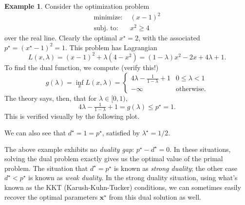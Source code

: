 \documentclass[10pt,letterpaper]{article}
\theoremstyle{definition}
\newtheorem{example}[theorem]{Example}
\theoremstyle{remark}
\newcommand\x{\boldsymbol{x}}
\begin{document}
\begin{example}
    Consider the optimization problem
    \begin{align*}
        \text{minimize: } & (x-1)^2\\
        \text{subj. to: } & x^2 \geq 4
    \end{align*}
    over the real line. Clearly the optimal $x^\star = 2$, with the associated $p^\star = (x^\star - 1)^2
    = 1$. This problem has Lagrangian
    \[
        L(x,\lambda) = (x-1)^2 + \lambda (4-x^2) = (1-\lambda)x^2 - 2x + 4\lambda + 1.
    \]
    To find the dual function, we compute (verify this!)
    \[
        g(\lambda) = \inf_x L(x,\lambda) = \begin{cases}
            4\lambda - \tfrac{1}{1-\lambda} + 1 & 0 \leq \lambda < 1\\
            -\infty & \text{otherwise.}
        \end{cases}
    \]
    The theory says, then, that for $\lambda\in[0,1)$,
    \[
        4\lambda - \tfrac{1}{1-\lambda} + 1 = g(\lambda) \leq p^\star = 1.
    \]
    This is verified visually by the following plot.
    \begin{center}
    \end{center}
    We can also see that $d^\star = 1 = p^\star$, satisfied by $\lambda^\star = 1/2$.
\end{example}

The above example exhibits no \emph{duality gap}: $p^\star - d^\star = 0$. In these situations, solving
the dual problem exactly gives us the optimal value of the primal problem. The situation that $d^\star = p^\star$
is known as \emph{strong duality}; the other case $d^\star < p^\star$ is known as \emph{weak duality}.
In the strong duality situation, using what's known as the KKT (Karush-Kuhn-Tucker) conditions, we can sometimes
easily recover the optimal parameters $\x^\star$ from this dual solution as well.
\end{document}
